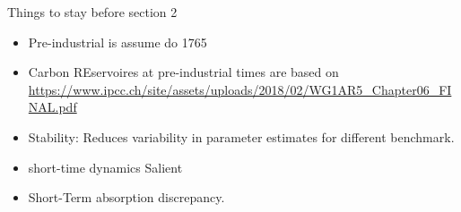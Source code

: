 \documentclass[11pt, a4paper, pdftex, twoside, dvipsnames]{article}
\begin{document}



Things to stay before section 2
\begin{itemize}
	\item Pre-industrial is assume do 1765
	\item Carbon REservoires at pre-industrial times are based on \url{https://www.ipcc.ch/site/assets/uploads/2018/02/WG1AR5_Chapter06_FINAL.pdf}   
\end{itemize}


\begin{itemize}
	\item Stability: Reduces variability in parameter estimates for different benchmark. 
	\item short-time dynamics Salient 
	\item  Short-Term absorption discrepancy.      
\end{itemize}               


\newpage
\end{document}
